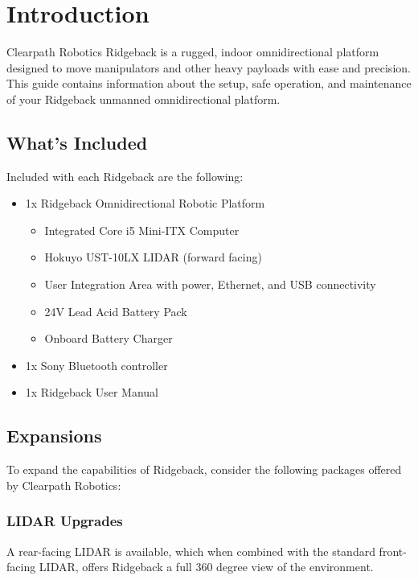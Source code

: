 \documentclass[]{clearpath-latex/clearpath-manual}
\begin{document}
\tableofcontents

\section{Introduction}
Clearpath Robotics Ridgeback is a rugged, indoor omnidirectional platform designed to move manipulators and other heavy payloads with ease and precision. This guide contains information about the setup, safe operation, and maintenance of your Ridgeback unmanned omnidirectional platform.

\subsection{What's Included}

Included with each Ridgeback are the following:

\begin{itemize}[nolistsep]
  \item 1x Ridgeback Omnidirectional Robotic Platform
  \begin{itemize}
    \item{Integrated Core i5 Mini-ITX Computer}
    \item{Hokuyo UST-10LX LIDAR (forward facing)}
    \item{User Integration Area with power, Ethernet, and USB connectivity}
    \item{24V Lead Acid Battery Pack}
    \item{Onboard Battery Charger}
  \end{itemize}
  \item 1x Sony Bluetooth controller
  \item 1x Ridgeback User Manual
\end{itemize}

\subsection{Expansions}

To expand the capabilities of Ridgeback, consider the following packages offered by Clearpath Robotics:

\subsubsection{LIDAR Upgrades}

A rear-facing LIDAR is available, which when combined with the standard front-facing LIDAR, offers Ridgeback a full 360 degree view of the environment.
\end{document}
